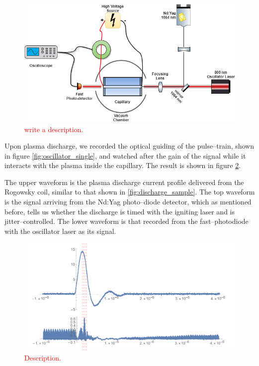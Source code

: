 \documentclass[justified,nofonts,nobib,openany]{tufte-book}
\begin{document}
\begin{figure}
\centering \includegraphics[width=\textwidth]{figures/oscillator.png}
\caption{\textcolor{red}{write a description.}}
\label{fig:oscillator}
\end{figure}
Upon plasma discharge, we recorded the optical guiding of the pulse--train, shown in figure  \ref{fig:oscillator_single}, and watched after the gain of the signal while it interacts with the plasma inside the capillary. The result is shown in figure \ref{fig:oscillator_gain}.

The upper waveform is the plasma discharge current profile delivered from the Rogowsky coil, similar to that shown in \ref{fig:discharge_sample}. The top waveform is the signal arriving from the Nd:Yag photo--diode detector, which as mentioned before, tells us whether the discharge is timed with the igniting laser and is jitter--controlled. The lower waveform is that recorded from the fast--photodiode with the oscillator laser as its signal.
\begin{figure}
    \centering
    \includegraphics[width=\textwidth]{figures/oscillator/guiding.pdf}
    \caption{\textcolor{red}{Description.}}
    \label{fig:oscillator_gain}
\end{figure}
\end{document}
